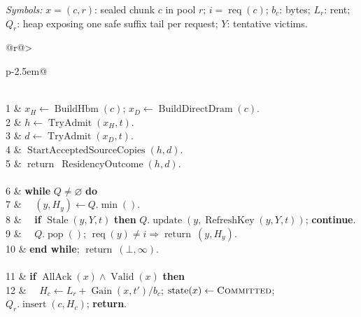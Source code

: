 \begin{algorithm*}[tp]
\caption{\textsc{SlackLandlord}: independent admission and asynchronous tier commitment}
\label{alg:slack-landlord}
\textit{Symbols:} $x=(c,r)$: sealed chunk $c$ in pool $r$; $i=\operatorname{req}(c)$; $b_c$: bytes;
$L_r$: rent; $Q_r$: heap exposing one safe suffix tail per request; $Y$: tentative victims.
\par\medskip
\noindent\begin{minipage}[t]{.48\textwidth}
\vspace{0pt}
\begin{tabular}[t]{@{}r@{\hspace{0.5em}}>{\raggedright\arraybackslash}p{\dimexpr\linewidth-2.5em\relax}@{}}
\\
1 & $x_H\gets\operatorname{BuildHbm}(c)$; $x_D\gets\operatorname{BuildDirectDram}(c)$.\\
2 & $h\gets\operatorname{TryAdmit}(x_H,t)$.\\
3 & $d\gets\operatorname{TryAdmit}(x_D,t)$.\\
4 & $\operatorname{StartAcceptedSourceCopies}(h,d)$.\\
5 & $\operatorname{return}\ \operatorname{ResidencyOutcome}(h,d)$.\\
\\
6 & \textbf{while} $Q\ne\varnothing$ \textbf{do}\\
7 & $\quad(y,H_y)\gets Q.\operatorname{min}()$.\\
8 & $\quad$\textbf{if} $\operatorname{Stale}(y,Y,t)$ \textbf{then} $Q.\operatorname{update}(y,\operatorname{RefreshKey}(y,Y,t))$; \textbf{continue}.\\
9 & $\quad Q.\operatorname{pop}()$; $\operatorname{req}(y)\ne i\Rightarrow\operatorname{return}\ (y,H_y)$.\\
10 & \textbf{end while}; $\operatorname{return}\ (\bot,\infty)$.\\
\\
11 & \textbf{if} $\operatorname{AllAck}(x)\land\operatorname{Valid}(x)$ \textbf{then}\\
12 & $\quad H_c\gets L_r+\operatorname{Gain}(x,t')/b_c$; $\operatorname{state}(x)\gets\textsc{Committed}$; $Q_r.\operatorname{insert}(c,H_c)$; \textbf{return}.\\

\end{tabular}
\end{minipage}
\end{algorithm*}
